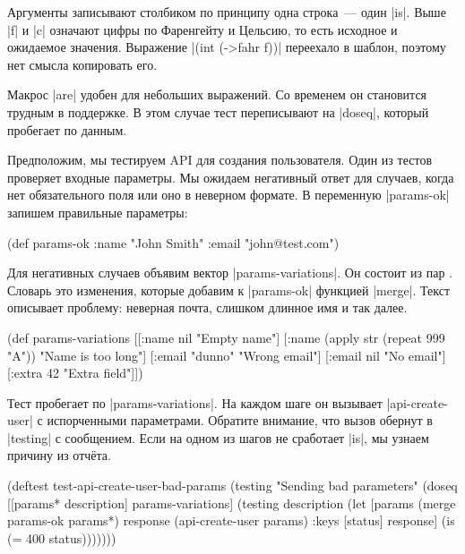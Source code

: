 Аргументы записывают столбиком по принципу одна строка~--- один
\spverb|is|. Выше \spverb|f| и \spverb|c| означают цифры по Фаренгейту и
Цельсию, то есть исходное и ожидаемое значения. Выражение \spverb|(int (->fahr f))|
переехало в шаблон, поэтому нет смысла копировать его.

Макрос \spverb|are| удобен для небольших выражений. Со временем он становится
трудным в поддержке. В этом случае тест переписывают на \spverb|doseq|, который
пробегает по данным.

Предположим, мы тестируем API для создания пользователя. Один из тестов
проверяет входные параметры. Мы ожидаем негативный ответ для случаев, когда нет
обязательного поля или оно в неверном формате. В переменную \spverb|params-ok|
запишем правильные параметры:

\begin{english}
  \begin{clojure}
(def params-ok {:name "John Smith" :email "john@test.com"})
  \end{clojure}
\end{english}

Для негативных случаев объявим вектор \spverb|params-variations|. Он состоит из
пар . Словарь это изменения, которые добавим к
\spverb|params-ok| функцией \spverb|merge|. Текст описывает проблему: неверная
почта, слишком длинное имя и так далее.

\begin{english}
  \begin{clojure}
(def params-variations
  [[{:name nil} "Empty name"]
   [{:name (apply str (repeat 999 "A"))} "Name is too long"]
   [{:email "dunno"} "Wrong email"]
   [{:email nil} "No email"]
   [{:extra 42} "Extra field"]])
  \end{clojure}
\end{english}

Тест пробегает по \spverb|params-variations|. На каждом шаге он вызывает
\spverb|api-create-user| с испорченными параметрами. Обратите внимание, что
вызов обернут в \spverb|testing| с сообщением. Если на одном из шагов не
сработает \spverb|is|, мы узнаем причину из отч\"{е}та.

\begin{english}
  \begin{clojure}
(deftest test-api-create-user-bad-params
  (testing "Sending bad parameters"
    (doseq [[params* description] params-variations]
      (testing description
        (let [params (merge params-ok params*)
              response (api-create-user params)
              {:keys [status]} response]
          (is (= 400 status)))))))
  \end{clojure}
\end{english}

